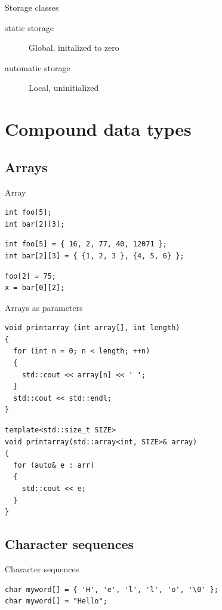 \documentclass{beamer}
\begin{document}
\begin{frame}{Storage classes}
\begin{description}
\item[static storage] Global, initalized to zero
\item[automatic storage] Local, uninitialized
\end{description}
\end{frame}

\section{Compound data types}
\subsection{Arrays}
\begin{frame}[fragile]{Array}
\begin{lstlisting}[caption=Array declaration]
int foo[5];
int bar[2][3];
\end{lstlisting}

\begin{lstlisting}[caption=Array initalisation]
int foo[5] = { 16, 2, 77, 40, 12071 };
int bar[2][3] = { {1, 2, 3 }, {4, 5, 6} };
\end{lstlisting}

\begin{lstlisting}[caption=Array access]
foo[2] = 75;
x = bar[0][2];
\end{lstlisting}
\end{frame}

\begin{frame}[fragile]{Arrays as parameters}
\begin{lstlisting}[caption=array as pointer]
void printarray (int array[], int length)
{
  for (int n = 0; n < length; ++n)
  {
    std::cout << array[n] << ' ';
  }
  std::cout << std::endl;
}
\end{lstlisting}

\begin{lstlisting}[caption=array as object]
template<std::size_t SIZE>
void printarray(std::array<int, SIZE>& array)
{
  for (auto& e : arr)
  {
    std::cout << e;
  }
}\end{lstlisting}
\end{frame}

\subsection{Character sequences}
\begin{frame}[fragile]{Character sequences}
\begin{lstlisting}[caption=Character sequences]
char myword[] = { 'H', 'e', 'l', 'l', 'o', '\0' };
char myword[] = "Hello";
\end{lstlisting}
\end{frame}
\end{document}
